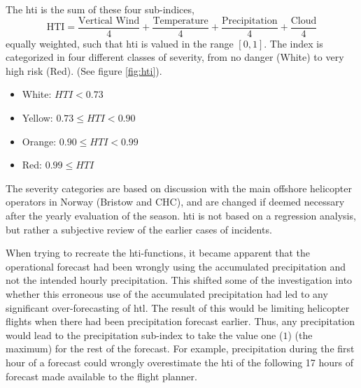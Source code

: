 The \acrshort{hti} is the sum of these four sub-indices, \[\text{HTI} = \frac{\text{Vertical Wind}}{4} + \frac{\text{Temperature}}{4} + \frac{\text{Precipitation}}{4} +\frac{\text{Cloud}}{4}\] equally weighted, such that \acrshort{hti} is valued in the range $[0,1]$. The index is categorized in four different classes of severity, from no danger (White) to very high risk (Red). (See figure \ref{fig:hti}).
\begin{itemize}
    \item White: $HTI < 0.73$
    \item Yellow: $0.73 \leq HTI < 0.90 $
    \item Orange: $0.90 \leq HTI < 0.99 $
    \item Red: $0.99 \leq HTI $
\end{itemize}
The severity categories are based on discussion with the main offshore helicopter operators in Norway (Bristow and CHC), and are changed if deemed necessary after the yearly evaluation of the season. \acrshort{hti} is not based on a regression analysis, but rather a subjective review of the earlier cases of incidents.

When trying to recreate the \acrshort{hti}-functions, it became apparent that the operational forecast had been wrongly using the accumulated precipitation and not the intended hourly precipitation. This shifted some of the investigation into whether this erroneous use of the accumulated precipitation had led to any significant over-forecasting of \acrshort{htl}. The result of this would be limiting helicopter flights when there had been precipitation forecast earlier. Thus, any precipitation would lead to the precipitation sub-index to take the value one ($1$) (the maximum) for the rest of the forecast. For example, precipitation during the first hour of a forecast could wrongly overestimate the \acrshort{hti} of the following 17 hours of forecast made available to the flight planner. 

